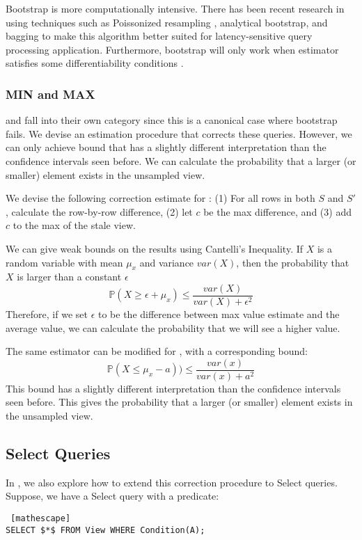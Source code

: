 Bootstrap is more computationally intensive.
There has been recent research in using techniques such as Poissonized resampling \cite{agarwalknowing}, analytical bootstrap\cite{DBLP:conf/sigmod/ZengGMZ14}, and bagging \cite{DBLP:conf/kdd/KleinerTASJ13} to make this algorithm better suited for latency-sensitive query processing application.
Furthermore, bootstrap will only work when estimator satisfies some differentiability conditions \cite{agarwalknowing}.

\subsubsection{MIN and MAX}
\minfunc and \maxfunc fall into their own category since this is a canonical case where bootstrap fails.
We devise an estimation procedure that corrects these queries.
However, we can only achieve bound that has a slightly different interpretation than the confidence intervals seen before.
We can calculate the probability that a larger (or smaller) element exists in the unsampled view.

We devise the following correction estimate for \maxfunc: (1) For all rows in both $S$ and $S'$, calculate the row-by-row difference, (2) let $c$ be the max difference, and (3) add $c$ to the max of the stale view.

We can give weak bounds on the results using Cantelli's Inequality.
If $X$ is a random variable with mean $\mu_x$ and variance $var(X)$, then the probability that $X$ is larger than a constant $\epsilon$ 
\[
\mathbb{P}(X \ge \epsilon + \mu_x ) \le \frac{var(X)}{var(X) + \epsilon^2}
\]
Therefore, if we set $\epsilon$ to be the difference between max value estimate and the average value, we can calculate the probability that we will see a higher value. 

The same estimator can be modified for \minfunc, with a corresponding bound:
\[
\mathbb{P}(X \le \mu_x - a )) \le \frac{var(x)}{var(x) + a^2}
\]
This bound has a slightly different interpretation than the confidence intervals seen before.
This gives the probability that a larger (or smaller) element exists in the unsampled view.

\iffalse
\vspace{-.25em}
\subsection{Select Queries}
In \svc, we also explore how to extend this correction procedure to Select queries.
Suppose, we have a Select query with a predicate:
\begin{lstlisting} [mathescape]
SELECT $*$ FROM View WHERE Condition(A);
\end{lstlisting}

